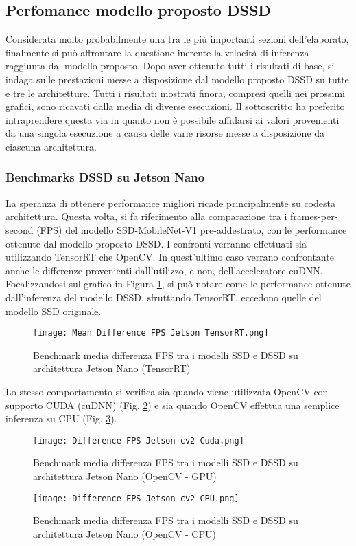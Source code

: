 \subsection{Perfomance modello proposto DSSD}
Considerata molto probabilmente una tra le più importanti sezioni dell'elaborato, 
finalmente si può affrontare la questione inerente la velocità 
di inferenza raggiunta dal modello proposto. Dopo aver ottenuto tutti i 
risultati di base, si indaga sulle prestazioni messe a disposizione dal modello 
proposto DSSD su tutte e tre le architetture. Tutti i risultati mostrati finora, 
compresi quelli nei prossimi grafici, sono ricavati dalla media di diverse 
esecuzioni. Il sottoscritto ha preferito intraprendere questa via in quanto 
non è possibile affidarsi ai valori provenienti da una singola esecuzione a 
causa delle varie risorse messe a disposizione da ciascuna architettura. 

\subsubsection{Benchmarks DSSD su Jetson Nano}
La speranza di ottenere performance migliori ricade principalmente su 
codesta architettura. Questa volta, si fa riferimento alla comparazione tra i 
frames-per-second (FPS) del modello SSD-MobileNet-V1 pre-addestrato, con 
le performance ottenute dal modello proposto DSSD. I confronti verranno 
effettuati sia utilizzando TensorRT che OpenCV. In quest'ultimo caso 
verrano confrontante anche le differenze provenienti dall'utilizzo, e non, 
dell'acceleratore cuDNN. Focalizzandosi sul grafico in Figura \ref{bench-jet-tensorrt}, si può 
notare come le performance ottenute dall'inferenza del modello DSSD, 
sfruttando TensorRT, eccedono quelle del modello SSD originale.
\begin{figure}
    \centering
    \texttt{[image: Mean Difference FPS Jetson TensorRT.png]}
    \centering
    \caption{Benchmark media differenza FPS tra i modelli SSD e DSSD su architettura Jetson Nano (TensorRT)}
    \label{bench-jet-tensorrt}
\end{figure}
Lo stesso 
comportamento si verifica sia quando viene utilizzata OpenCV con supporto 
CUDA (cuDNN) (Fig. \ref{bench-jet-cv2-cudnn}) e sia quando OpenCV effettua una semplice 
inferenza su CPU (Fig. \ref{bench-jet-cv2-CPU}).
\begin{figure}
    \centering
    \texttt{[image: Difference FPS Jetson cv2 Cuda.png]}
    \centering
    \caption{Benchmark media differenza FPS tra i modelli SSD e DSSD su architettura Jetson Nano (OpenCV - GPU)}
    \label{bench-jet-cv2-cudnn}
\end{figure}
\begin{figure}
    \centering
    \texttt{[image: Difference FPS Jetson cv2 CPU.png]}
    \centering
    \caption{Benchmark media differenza FPS tra i modelli SSD e DSSD su architettura Jetson Nano (OpenCV - CPU)}
    \label{bench-jet-cv2-CPU}
\end{figure}

